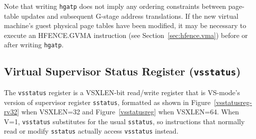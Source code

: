 Note that writing {\tt hgatp} does not imply any ordering constraints between
page-table updates and subsequent G-stage address translations.
If the new virtual machine's guest physical page tables have been modified, it
may be necessary to execute an HFENCE.GVMA instruction
(see Section~\ref{sec:hfence.vma}) before or after writing {\tt hgatp}.

\subsection{Virtual Supervisor Status Register ({\tt vsstatus})}

The {\tt vsstatus} register is a VSXLEN-bit read/write register that is
VS-mode's version of supervisor register {\tt sstatus}, formatted as
shown in Figure~\ref{vsstatusreg-rv32} when VSXLEN=32 and
Figure~\ref{vsstatusreg} when VSXLEN=64.
When V=1, {\tt vsstatus} substitutes for the usual {\tt sstatus}, so
instructions that normally read or modify {\tt sstatus} actually access
{\tt vsstatus} instead.

\begin{figure*}[h!]
{\footnotesize
\begin{center}
\setlength{\tabcolsep}{4pt}
\end{center}
}
\vspace{-0.1in}
\caption{Virtual supervisor status register ({\tt vsstatus}) for RV32.}
\label{vsstatusreg-rv32}
\end{figure*}

